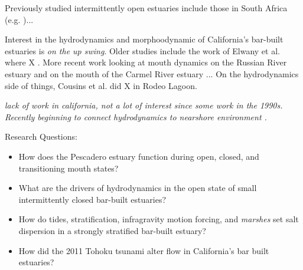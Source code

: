 Previously studied intermittently open estuaries include those in South Africa (e.g. \cite{largier_dynamics_1991})...


Interest in the hydrodynamics and morphoodynamic of California's bar-built estuaries is \emph{on the up swing}. Older studies include the work of Elwany et al. where X \cite{elwany_opening_1998}. More recent work looking at mouth dynamics on the Russian River estuary \parencite{behrens_characterization_2009, behrens_episodic_2013} and on the mouth of the Carmel River estuary \parencite{rich_hydrologic_2013}... On the hydrodynamics side of things, Cousins et al. \cite{cousins_hydrodynamics_2011} did X in Rodeo Lagoon. 


\emph{lack of work in california, not a lot of interest since some work in the 1990s.  Recently beginning to connect hydrodynamics to nearshore environment \parencite{dodet_wave-current_2013, uncles_infragravity_2014}.}



Research Questions:
\begin{itemize}
	\item{How does the Pescadero estuary function during open, closed, and transitioning mouth states?}
	\item{What are the drivers of hydrodynamics in the open state of small intermittently closed bar-built estuaries?}
	\item{How do tides, stratification, infragravity motion forcing, and \emph{marshes} set salt dispersion in a strongly stratified bar-built estuary?}
	\item{How did the 2011 Tohoku tsunami alter flow in California's bar built estuaries?}
\end{itemize}


